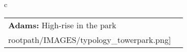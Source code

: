\begin{table}[H]
        \begin{tabular}{c}
        \begin{tabular}{m{1.5in} m{2in}}
\textbf{Adams:} {High-rise in the park} & \texttt{[image: \\rootpath/IMAGES/typology\_towerpark.png]}
\end{tabular}\end{tabular}
        \end{table}